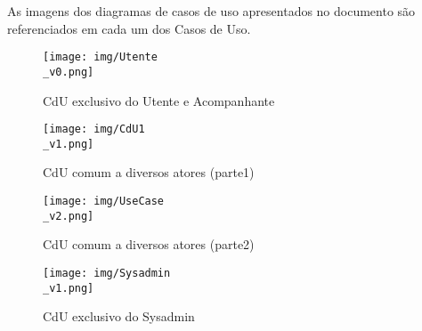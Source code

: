 As imagens dos diagramas de casos de uso apresentados no documento são referenciados em cada um dos Casos de Uso.

\begin{figure}[htbp]
	\centering
	\texttt{[image: img/Utente\\\_v0.png]}  %
	\caption{CdU exclusivo do Utente e Acompanhante}
	\label{fig:cdu3110}
\end{figure}


\begin{figure}[htbp]
	\centering
	\texttt{[image: img/CdU1\\\_v1.png]}  %
	\caption{CdU comum a diversos atores (parte1)}
	\label{fig:cdu3111}
\end{figure}


\begin{figure}[htbp]
	\centering
	\texttt{[image: img/UseCase\\\_v2.png]}  %
	\caption{CdU comum a diversos atores (parte2)}
	\label{fig:cdu3112}
\end{figure}


\begin{figure}[htbp]
	\centering
	\texttt{[image: img/Sysadmin\\\_v1.png]}  %
	\caption{CdU exclusivo do Sysadmin}
	\label{fig:cdu3113}
\end{figure}


